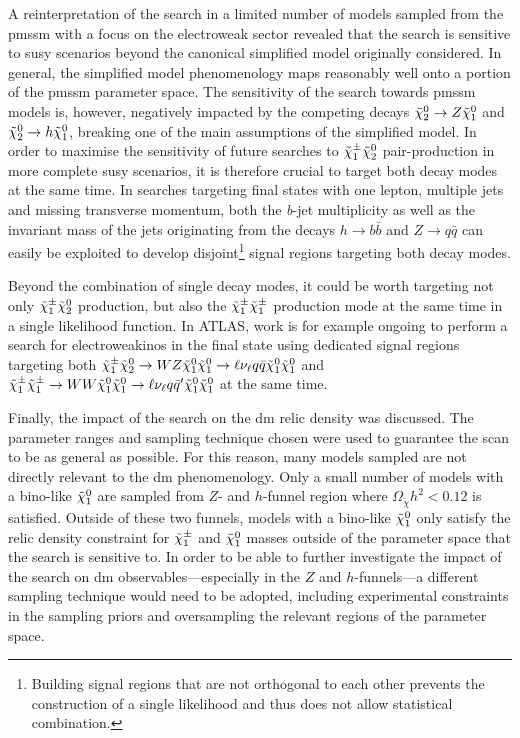 A reinterpretation of the \onelepton search in a limited number of models sampled from the \gls{pmssm} with a focus on the electroweak sector revealed that the search is sensitive to \gls{susy} scenarios beyond the canonical simplified model originally considered.
In general, the simplified model phenomenology maps reasonably well onto a portion of the \gls{pmssm} parameter space. The sensitivity of the \onelepton search towards \gls{pmssm} models is, however, negatively impacted by the competing decays $\tilde{\chi}_2^0 \rightarrow Z \tilde{\chi}_1^0$ and $\tilde{\chi}_2^0 \rightarrow h \tilde{\chi}_1^0$, breaking one of the main assumptions of the simplified model.
In order to maximise the sensitivity of future searches to $\tilde{\chi}_1^\pm\tilde{\chi}_2^0$ pair-production in more complete \gls{susy} scenarios, it is therefore crucial to target both decay modes at the same time.
In searches targeting final states with one lepton, multiple jets and missing transverse momentum, both the \textit{b}-jet multiplicity as well as the invariant mass of the jets originating from the decays $h\rightarrow b\bar{b}$ and $Z\rightarrow q\bar{q}$ can easily be exploited to develop disjoint\footnote{Building signal regions that are not orthogonal to each other prevents the construction of a single likelihood and thus does not allow statistical combination.} signal regions targeting both decay modes.

Beyond the combination of single decay modes, it could be worth targeting not only $\tilde{\chi}_1^\pm\tilde{\chi}_2^0$ production, but also the $\tilde{\chi}_1^\pm\tilde{\chi}_1^\pm$ production mode at the same time in a single likelihood function. In ATLAS, work is for example ongoing to perform a search for electroweakinos in the \onelepton final state using dedicated signal regions targeting both $\tilde{\chi}_1^\pm\tilde{\chi}_2^0 \rightarrow WZ\tilde{\chi}_1^0\tilde{\chi}_1^0\rightarrow \ell\nu_\ell q\bar{q} \tilde{\chi}_1^0\tilde{\chi}_1^0$ and $\tilde{\chi}_1^\pm\tilde{\chi}_1^\pm \rightarrow WW\tilde{\chi}_1^0\tilde{\chi}_1^0\rightarrow \ell\nu_\ell q\bar{q}' \tilde{\chi}_1^0\tilde{\chi}_1^0$ at the same time. 

Finally, the impact of the \onelepton search on the \gls{dm} relic density was discussed. The parameter ranges and sampling technique chosen were used to guarantee the scan to be as general as possible. For this reason, many models sampled are not directly relevant to the \gls{dm} phenomenology. Only a small number of models with a bino-like $\tilde{\chi}_1^0$ are sampled from $Z$- and $h$-funnel region where $\Omega_{\tilde{\chi}} h^2 < 0.12$ is satisfied. Outside of these two funnels, models with a bino-like $\tilde{\chi}_1^0$ only satisfy the relic density constraint for $\tilde{\chi}_1^\pm$ and $\tilde{\chi}_1^0$ masses outside of the parameter space that the \onelepton search is sensitive to. In order to be able to further investigate the impact of the \onelepton search on \gls{dm} observables---especially in the $Z$ and $h$-funnels---a different sampling technique would need to be adopted, including experimental constraints in the sampling priors and oversampling the relevant regions of the parameter space. 



